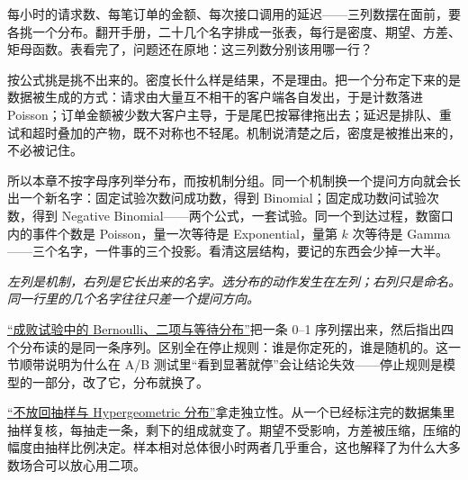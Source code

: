 每小时的请求数、每笔订单的金额、每次接口调用的延迟——三列数摆在面前，要各挑一个分布。翻开手册，二十几个名字排成一张表，每行是密度、期望、方差、矩母函数。表看完了，问题还在原地：这三列数分别该用哪一行？

按公式挑是挑不出来的。密度长什么样是结果，不是理由。把一个分布定下来的是数据被生成的方式：请求由大量互不相干的客户端各自发出，于是计数落进 Poisson；订单金额被少数大客户主导，于是尾巴按幂律拖出去；延迟是排队、重试和超时叠加的产物，既不对称也不轻尾。机制说清楚之后，密度是被推出来的，不必被记住。

所以本章不按字母序列举分布，而按机制分组。同一个机制换一个提问方向就会长出一个新名字：固定试验次数问成功数，得到 Binomial；固定成功数问试验次数，得到 Negative Binomial——两个公式，一套试验。同一个到达过程，数窗口内的事件个数是 Poisson，量一次等待是 Exponential，量第 \(k\) 次等待是 Gamma——三个名字，一件事的三个投影。看清这层结构，要记的东西会少掉一大半。

\begin{center}

\emph{左列是机制，右列是它长出来的名字。选分布的动作发生在左列；右列只是命名。同一行里的几个名字往往只差一个提问方向。}
\end{center}

\hyperref[sec:05-Probability/06-Common-Distributions/01]{``成败试验中的 Bernoulli、二项与等待分布''}把一条 0--1 序列摆出来，然后指出四个分布读的是同一条序列。区别全在停止规则：谁是你定死的，谁是随机的。这一节顺带说明为什么在 A/B 测试里``看到显著就停''会让结论失效——停止规则是模型的一部分，改了它，分布就换了。

\hyperref[sec:05-Probability/06-Common-Distributions/02]{``不放回抽样与 Hypergeometric 分布''}拿走独立性。从一个已经标注完的数据集里抽样复核，每抽走一条，剩下的组成就变了。期望不受影响，方差被压缩，压缩的幅度由抽样比例决定。样本相对总体很小时两者几乎重合，这也解释了为什么大多数场合可以放心用二项。

